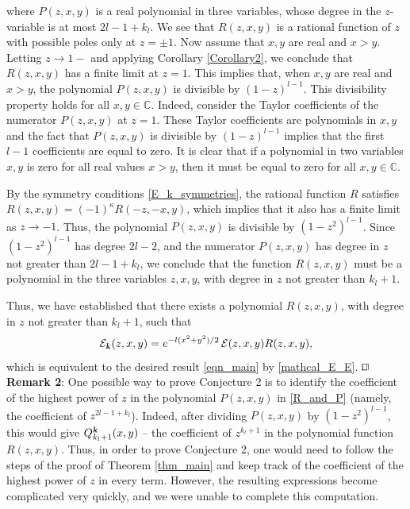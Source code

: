 \documentclass[12pt]{article}
\def\qed{\hfill$\sqcap\kern-8.0pt\hbox{$\sqcup$}$\\}
\def\E{{\mathcal E}}
\def\c{{\mathbb C}}
\def\k{\textbf{\textsl{k}}}
\begin{document}
where $P(z,x,y)$ is a real polynomial in three variables, whose degree in the $z$-variable is at most $2l-1+k_l$.  We see that $R(z,x,y)$ is a rational function of $z$ with possible poles only at $z=\pm 1$. Now assume that $x, y$ are real and $x>y$.  Letting $z\to 1-$ and applying Corollary \ref{Corollary2}, we  conclude that  $R(z,x,y)$ has a finite limit at $z=1$. This implies that, when $x, y$ are real and $x>y$, the polynomial $P(z,x,y)$ is divisible by $(1-z)^{l-1}$. This divisibility property holds for all $x,y\in \c$. Indeed, consider the Taylor coefficients of the numerator  $P(z,x,y)$ at $z=1$. These Taylor coefficients are polynomials in $x,y$ and the fact that $P(z,x,y)$ is divisible by $(1-z)^{l-1}$ implies that the first $l-1$ coefficients are equal to zero. It is clear that if a polynomial in two variables $x,y$ is zero for all real values $x>y$, then it must be equal to zero for all $x,y\in \c$. 

By the symmetry conditions \eqref{E_k_symmetries}, the rational function $R$ satisfies $R(z,x,y)=(-1)^{\kappa} R(-z,-x,y)$, which implies that it also has a finite limit as $z\to -1$. Thus, the polynomial $P(z,x,y)$ is divisible by $(1-z^2)^{l-1}$. Since $(1-z^2)^{l-1}$ has degree $2l-2$, and the numerator $P(z,x,y)$ has degree in $z$ not greater than $2l-1+k_l$, we conclude that the function $R(z,x,y)$ must be a polynomial  in the three variables $z,x,y$, with degree in $z$ not greater than $k_l+1$. 

Thus, we have established that there exists a polynomial $R(z,x,y)$, with degree in $z$ not greater than $k_l+1$, such that  
\[
\E_{\k}(z,x,y)=e^{-l(x^2+y^2)/2}\, \E(z,x,y)  R(z,x,y),
\]
which is equivalent to the desired result \eqref{eqn_main} by \eqref{mathcal_E_E}. 
\qed

\vspace{0.2cm}
\noindent
{\bf Remark 2}: One possible way to prove Conjecture 2 is to identify the coefficient of the highest power of $z$ in the polynomial $P(z,x,y)$ in \eqref{R_and_P} (namely, the coefficient of $z^{2l-1+k_l}$). Indeed, after dividing $P(z,x,y)$ by $(1-z^2)^{l-1}$, this would give $Q^{\k}_{k_l+1}(x,y)$ -- the coefficient of $z^{k_l+1}$ in the polynomial function $R(z,x,y)$. Thus, in order to prove Conjecture 2, one would need to follow the steps of the proof of Theorem \ref{thm_main} and keep track of the coefficient of the highest power of $z$ in every term. However, the resulting expressions become complicated very quickly, and we were unable to complete this computation. 
\vspace{0.2cm}
\end{document}
